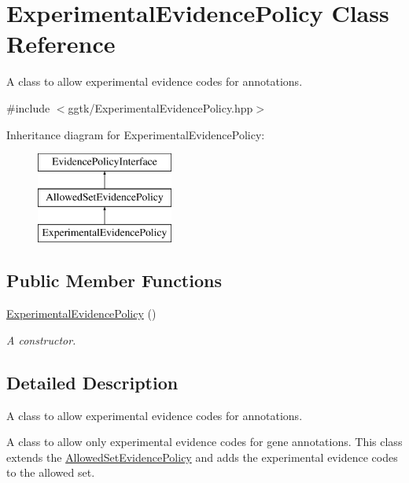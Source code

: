 \hypertarget{classExperimentalEvidencePolicy}{}\section{Experimental\+Evidence\+Policy Class Reference}
\label{classExperimentalEvidencePolicy}


A class to allow experimental evidence codes for annotations.  




{\ttfamily \#include $<$ggtk/\+Experimental\+Evidence\+Policy.\+hpp$>$}

Inheritance diagram for Experimental\+Evidence\+Policy\+:\begin{figure}[H]
\begin{center}
\leavevmode
\includegraphics[height=3.000000cm]{classExperimentalEvidencePolicy}
\end{center}
\end{figure}
\subsection*{Public Member Functions}
\begin{DoxyCompactItemize}
\item 
\hyperlink{classExperimentalEvidencePolicy_a842128956f37cc8e5d1cb1c175a6a5a4}{Experimental\+Evidence\+Policy} ()
\begin{DoxyCompactList}\small\item\em A constructor. \end{DoxyCompactList}\end{DoxyCompactItemize}


\subsection{Detailed Description}
A class to allow experimental evidence codes for annotations. 

A class to allow only experimental evidence codes for gene annotations. This class extends the \hyperlink{classAllowedSetEvidencePolicy}{Allowed\+Set\+Evidence\+Policy} and adds the experimental evidence codes to the allowed set. 

